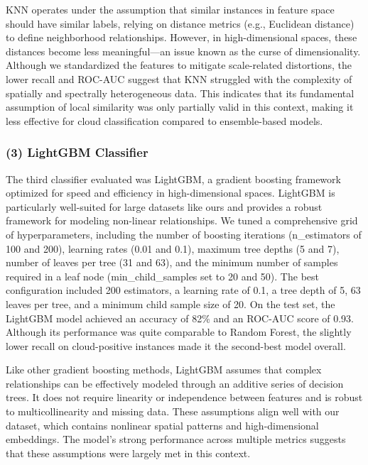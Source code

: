 \documentclass[11pt]{article}
\begin{document}
KNN operates under the assumption that similar instances in feature
space should have similar labels, relying on distance metrics (e.g.,
Euclidean distance) to define neighborhood relationships. However, in
high-dimensional spaces, these distances become less meaningful---an
issue known as the curse of dimensionality. Although we standardized the
features to mitigate scale-related distortions, the lower recall and
ROC-AUC suggest that KNN struggled with the complexity of spatially and
spectrally heterogeneous data. This indicates that its fundamental
assumption of local similarity was only partially valid in this context,
making it less effective for cloud classification compared to
ensemble-based models.

\subsubsection*{(3) LightGBM Classifier}\label{lightgbm-classifier}

The third classifier evaluated was LightGBM, a gradient boosting
framework optimized for speed and efficiency in high-dimensional spaces.
LightGBM is particularly well-suited for large datasets like ours and
provides a robust framework for modeling non-linear relationships. We
tuned a comprehensive grid of hyperparameters, including the number of
boosting iterations (n\_estimators of 100 and 200), learning rates (0.01
and 0.1), maximum tree depths (5 and 7), number of leaves per tree (31
and 63), and the minimum number of samples required in a leaf node
(min\_child\_samples set to 20 and 50). The best configuration included
200 estimators, a learning rate of 0.1, a tree depth of 5, 63 leaves per
tree, and a minimum child sample size of 20. On the test set, the
LightGBM model achieved an accuracy of 82\% and an ROC-AUC score of
0.93. Although its performance was quite comparable to Random Forest,
the slightly lower recall on cloud-positive instances made it the
second-best model overall.

Like other gradient boosting methods, LightGBM assumes that complex
relationships can be effectively modeled through an additive series of
decision trees. It does not require linearity or independence between
features and is robust to multicollinearity and missing data. These
assumptions align well with our dataset, which contains nonlinear
spatial patterns and high-dimensional embeddings. The model's strong
performance across multiple metrics suggests that these assumptions were
largely met in this context.
\end{document}
